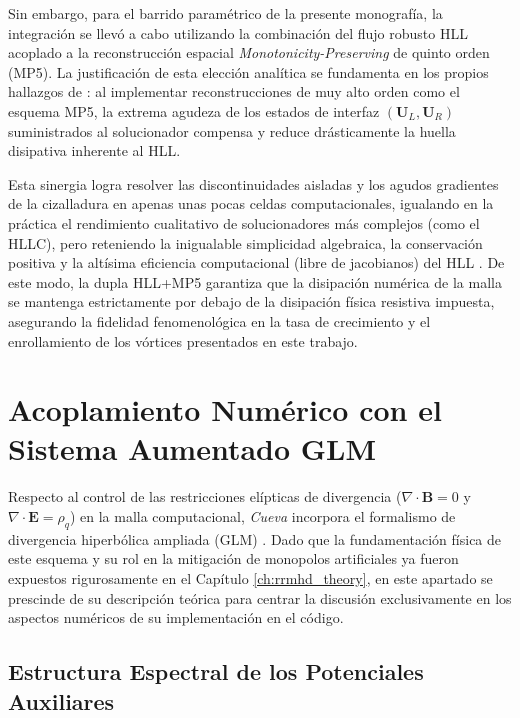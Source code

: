 Sin embargo, para el barrido paramétrico de la presente monografía, la integración se llevó a cabo utilizando la combinación del flujo robusto HLL acoplado a la reconstrucción espacial \textit{Monotonicity-Preserving} de quinto orden (MP5). La justificación de esta elección analítica se fundamenta en los propios hallazgos de \textcite{miranda-aranguren-2018}: al implementar reconstrucciones de muy alto orden como el esquema MP5, la extrema agudeza de los estados de interfaz $(\mathbf{U}_L, \mathbf{U}_R)$ suministrados al solucionador compensa y reduce drásticamente la huella disipativa inherente al HLL. 

Esta sinergia logra resolver las discontinuidades aisladas y los agudos gradientes de la cizalladura en apenas unas pocas celdas computacionales, igualando en la práctica el rendimiento cualitativo de solucionadores más complejos (como el HLLC), pero reteniendo la inigualable simplicidad algebraica, la conservación positiva y la altísima eficiencia computacional (libre de jacobianos) del HLL \parencite{toro-2009}. De este modo, la dupla HLL+MP5 garantiza que la disipación numérica de la malla se mantenga estrictamente por debajo de la disipación física resistiva impuesta, asegurando la fidelidad fenomenológica en la tasa de crecimiento y el enrollamiento de los vórtices presentados en este trabajo.

\section[Acoplamiento con el sistema GLM]{Acoplamiento Numérico con el Sistema Aumentado GLM}
\label{sec:Acoplamiento_GLM_HLL}

\primerparrafo Respecto al control de las restricciones elípticas de divergencia ($\nabla \cdot \mathbf{B} = 0$ y $\nabla \cdot \mathbf{E} = \rho_q$) en la malla computacional, \textit{Cueva} incorpora el formalismo de divergencia hiperbólica ampliada (GLM) \parencite{Dedner_etal:2002}. Dado que la fundamentación física de este esquema y su rol en la mitigación de monopolos artificiales ya fueron expuestos rigurosamente en el Capítulo \ref{ch:rrmhd_theory}, en este apartado se prescinde de su descripción teórica para centrar la discusión exclusivamente en los aspectos numéricos de su implementación en el código.

\subsection{Estructura Espectral de los Potenciales Auxiliares}

